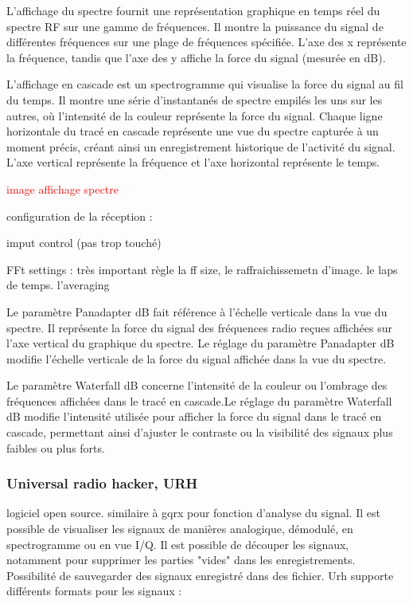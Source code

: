 L'affichage du spectre fournit une représentation graphique en temps réel du spectre RF sur une gamme de fréquences.
Il montre la puissance du signal de différentes fréquences sur une plage de fréquences spécifiée.
L'axe des x représente la fréquence, tandis que l'axe des y affiche la force du signal (mesurée en dB).

L'affichage en cascade est un spectrogramme qui visualise la force du signal au fil du temps.
Il montre une série d'instantanés de spectre empilés les uns sur les autres, où l'intensité de la couleur représente la force du signal.
Chaque ligne horizontale du tracé en cascade représente une vue du spectre capturée à un moment précis, créant ainsi un enregistrement historique de l'activité du signal.
L'axe vertical représente la fréquence et l'axe horizontal représente le temps.

\textcolor{red}{image affichage spectre}

configuration de la réception :

imput control (pas trop touché)

FFt settings : très important règle la ff size, le raffraichissemetn d'image. le laps de temps. l'averaging

Le paramètre Panadapter dB fait référence à l'échelle verticale dans la vue du spectre. Il représente la force du signal des fréquences radio reçues affichées sur l'axe vertical du graphique du spectre. Le réglage du paramètre Panadapter dB modifie l’échelle verticale de la force du signal affichée dans la vue du spectre.

Le paramètre Waterfall dB concerne l'intensité de la couleur ou l'ombrage des fréquences affichées dans le tracé en cascade.Le réglage du paramètre Waterfall dB modifie l'intensité utilisée pour afficher la force du signal dans le tracé en cascade, permettant ainsi d'ajuster le contraste ou la visibilité des signaux plus faibles ou plus forts.


\subsubsection{Universal radio hacker, URH}

logiciel open source. similaire à gqrx pour fonction d'analyse du signal. Il est possible de visualiser les signaux de manières analogique, démodulé, en spectrogramme ou en vue I/Q. Il est possible de découper les signaux, notamment pour supprimer les parties "vides" dans les enregistrements. Possibilité de sauvegarder des signaux enregistré dans des fichier. Urh supporte différents formats pour les signaux :

